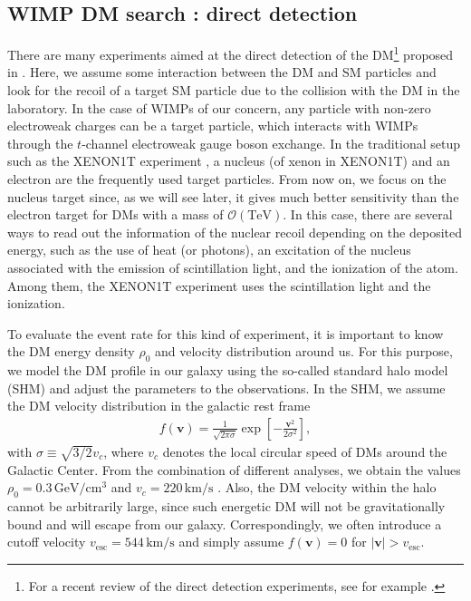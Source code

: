 \documentclass[12pt,twoside,book]{article}
\begin{document}
\subsection{WIMP DM search : direct detection}
\label{sec:direct_detection}

There are many experiments aimed at the direct detection of the DM\footnote
{
  For a recent review of the direct detection experiments, see for example \cite{Undagoitia:2015gya}.
}
proposed in \cite{Goodman:1984dc}.
Here, we assume some interaction between the DM and SM particles and look for the recoil of a target SM particle due to the collision with the DM in the laboratory.
In the case of WIMPs of our concern, any particle with non-zero electroweak charges can be a target particle, which interacts with WIMPs through the $t$-channel electroweak gauge boson exchange.
In the traditional setup such as the XENON1T experiment \cite{Aprile:2012zx}, a nucleus (of xenon in XENON1T) and an electron are the frequently used target particles.
From now on, we focus on the nucleus target since, as we will see later, it gives much better sensitivity than the electron target for DMs with a mass of $\mathcal{O} (\mathrm{TeV})$.
In this case, there are several ways to read out the information of the nuclear recoil depending on the deposited energy, such as the use of heat (or photons), an excitation of the nucleus associated with the emission of scintillation light, and the ionization of the atom.
Among them, the XENON1T experiment uses the scintillation light and the ionization.

To evaluate the event rate for this kind of experiment, it is important to know the DM energy density $\rho_0$ and velocity distribution around us.
For this purpose, we model the DM profile in our galaxy using the so-called standard halo model (SHM) and adjust the parameters to the observations.
In the SHM, we assume the DM velocity distribution in the galactic rest frame
\begin{align}
  f(\bm{v}) = \frac{1}{\sqrt{2\pi \sigma}} \exp \left[ -\frac{\bm{v}^2}{2 \sigma^2} \right],
\end{align}
with $\sigma \equiv \sqrt{3/2} v_c$, where $v_c$ denotes the local circular speed of DMs around the Galactic Center.
From the combination of different analyses, we obtain the values $\rho_0 = 0.3\,\mathrm{GeV / cm^3}$ and $v_c = 220\,\mathrm{km/s}$ \cite{Kerr:1986hz,Green:2011bv}.
Also, the DM velocity within the halo cannot be arbitrarily large, since such energetic DM will not be gravitationally bound and will escape from our galaxy.
Correspondingly, we often introduce a cutoff velocity $v_{\mathrm{esc}} = 544\,\mathrm{km / s}$ \cite{Smith:2006ym} and simply assume $f(\bm{v}) = 0$ for $|\bm{v}| > v_{\mathrm{esc}}$.
\end{document}
